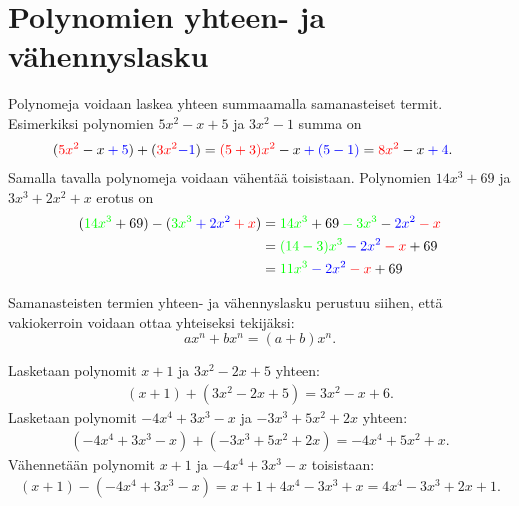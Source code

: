 \chapter{Polynomien yhteen- ja vähennyslasku}

Polynomeja voidaan laskea yhteen summaamalla samanasteiset termit. Esimerkiksi polynomien $5x^2-x+5$ ja $3x^2-1$ summa on
   \begin{align*}
        (\textcolor{red}{5x^2}-x\textcolor{blue}{{}+5})+(\textcolor{red}{3x^2}\textcolor{blue}{-1}) &=\textcolor{red}{(5+3)x^2}-x\textcolor{blue}{{}+(5-1)}=\textcolor{red}{8x^2}-x\textcolor{blue}{{}+4}.
    \end{align*}
Samalla tavalla polynomeja voidaan vähentää toisistaan. Polynomien
$14x^3+69$ ja $3x^3+2x^2+x$ erotus on
    \begin{align*}
        (\textcolor{green}{14x^3} + 69) - (\textcolor{green}{3x^3} \textcolor{blue}{{}+ 2x^2} \textcolor{red}{{}+x})
        &= \textcolor{green}{14x^3} + 69 \textcolor{green}{{}-3x^3} - 
            \textcolor{blue}{2x^2} \textcolor{red}{{}-x} \\
        &= \textcolor{green}{(14-3)x^3} \textcolor{blue}{{}-2x^2} \textcolor{red}{{}-x} + 69 \\
        &= \textcolor{green}{11x^3} \textcolor{blue}{{}-2x^2} \textcolor{red}{{}-x} + 69
    \end{align*}
    
Samanasteisten termien yhteen- ja vähennyslasku perustuu siihen, että vakiokerroin voidaan
ottaa yhteiseksi tekijäksi:
\[
ax^n+bx^n=(a+b)x^n.
\]
    
\begin{esimerkki}
Lasketaan polynomit
$x+1$ ja $3x^2-2x+5$ yhteen:
   \begin{align*}
        (x+1)+(3x^2-2x+5) =3x^2-x+6.
    \end{align*}
Lasketaan polynomit $-4x^4+3x^3-x$ ja $-3x^3+5x^2+2x$ yhteen:
   \begin{align*}
        (-4x^4+3x^3-x)+(-3x^3+5x^2+2x) =-4x^4+5x^2+x.
    \end{align*}
Vähennetään polynomit $x+1$ ja $-4x^4+3x^3-x$ toisistaan:
   \begin{align*}
        (x+1)-(-4x^4+3x^3-x) =x+1+4x^4-3x^3+x=4x^4-3x^3+2x+1.
    \end{align*}
\end{esimerkki}



